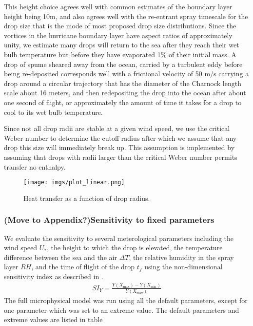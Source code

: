 \documentclass[10pt,a4paper]{article}
\begin{document}
This height choice agrees well with common estimates of the boundary layer height being 10m, and also agrees well with the re-entrant spray timescale for the drop size that is the mode of most proposed drop size distributions. Since the vortices in the hurricane boundary layer have aspect ratios of approximately unity, we estimate many drops will return to the sea after they reach their wet bulb temperature but before they have evaporated 1\% of their initial mass.  A drop of spume sheared away from the ocean, carried by a turbulent eddy before being re-deposited corresponds well with a frictional velocity of 50 m/s carrying a drop around a circular trajectory that has the diameter of the Charnock length scale about 16 meters, and then redepositing the drop into the ocean after about one second of flight, or approximately the amount of time it takes for a drop to cool to its wet bulb temperature. \par 
Since not all drop radii are stable at a given wind speed, we use the critical Weber number to determine the cutoff radius after which we assume that any drop this size will immediately break up. This assumption is implemented by assuming that drops with radii larger than the critical Weber number permits transfer no enthalpy. 
\begin{figure}
\centering
\texttt{[image: imgs/plot\_linear.png]}
\caption{Heat transfer as a function of drop radius.}
\end{figure}

\subsubsection{(Move to Appendix?)Sensitivity to fixed parameters}

We evaluate the sensitivity to several meterological parameters including the wind speed $U_*$, the height to which the drop is elevated, the temperature difference between the sea and the air $\Delta T$, the relative humidity in the spray layer $RH$,  and the time of flight of the drop $t_f$ using the non-dimensional sensitivity index as described in \citet{Hamby1994}.\\
\begin{align}
SI_Y = \frac{Y(X_{\max}) - Y(X_{\min})}{Y(X_{\max})}
\end{align}
The full microphysical model was run using all the default parameters, except for one parameter which was set to an extreme value. The default parameters and extreme values are listed in table 
\end{document}
